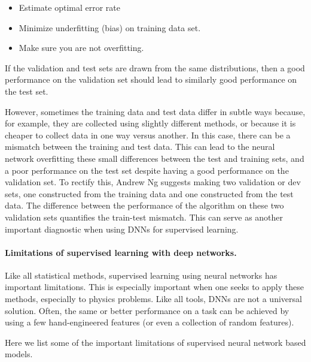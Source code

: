 \begin{itemize}
\item Estimate optimal error rate

\item Minimize underfitting (bias) on training data set.

\item Make sure you are not overfitting.
\end{itemize}

\noindent
If the validation and test sets are drawn from the same distributions,
then a good performance on the validation set should lead to similarly
good performance on the test set. 

However, sometimes
the training data and test data differ in subtle ways because, for
example, they are collected using slightly different methods, or
because it is cheaper to collect data in one way versus another. In
this case, there can be a mismatch between the training and test
data. This can lead to the neural network overfitting these small
differences between the test and training sets, and a poor performance
on the test set despite having a good performance on the validation
set. To rectify this, Andrew Ng suggests making two validation or dev
sets, one constructed from the training data and one constructed from
the test data. The difference between the performance of the algorithm
on these two validation sets quantifies the train-test mismatch. This
can serve as another important diagnostic when using DNNs for
supervised learning.

\paragraph{Limitations of supervised learning with deep networks.}
Like all statistical methods, supervised learning using neural
networks has important limitations. This is especially important when
one seeks to apply these methods, especially to physics problems. Like
all tools, DNNs are not a universal solution. Often, the same or
better performance on a task can be achieved by using a few
hand-engineered features (or even a collection of random
features). 

Here we list some of the important limitations of supervised neural network based models. 

